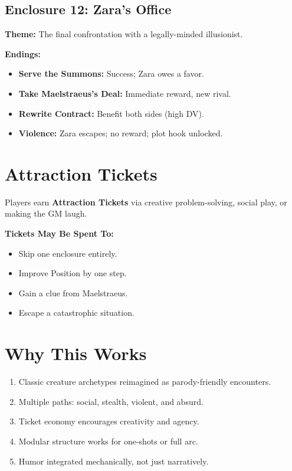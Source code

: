 \subsection{Enclosure 12: Zara's Office}
\textbf{Theme:} The final confrontation with a legally-minded illusionist.

\textbf{Endings:}
\begin{itemize}
  \item \textbf{Serve the Summons:} Success; Zara owes a favor.
  \item \textbf{Take Maelstraeus's Deal:} Immediate reward, new rival.
  \item \textbf{Rewrite Contract:} Benefit both sides (high DV).
  \item \textbf{Violence:} Zara escapes; no reward; plot hook unlocked.
\end{itemize}

\section{Attraction Tickets}
Players earn \textbf{Attraction Tickets} via creative problem-solving, social play, or making the GM laugh.

\textbf{Tickets May Be Spent To:}
\begin{itemize}
  \item Skip one enclosure entirely.
  \item Improve Position by one step.
  \item Gain a clue from Maelstraeus.
  \item Escape a catastrophic situation.
\end{itemize}

\section{Why This Works}
\begin{enumerate}
  \item Classic creature archetypes reimagined as parody-friendly encounters.
  \item Multiple paths: social, stealth, violent, and absurd.
  \item Ticket economy encourages creativity and agency.
  \item Modular structure works for one-shots or full arc.
  \item Humor integrated mechanically, not just narratively.
\end{enumerate}

